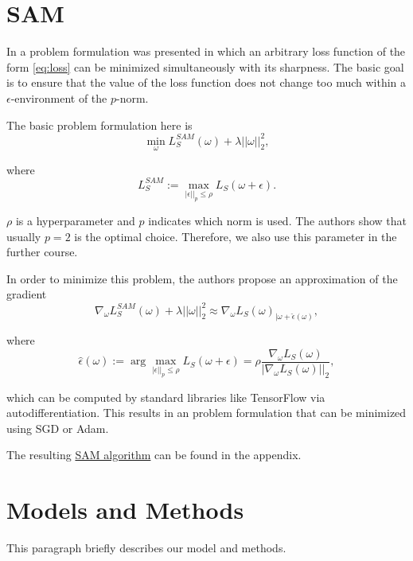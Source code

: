 \documentclass[10pt,conference,compsocconf]{IEEEtran}
\begin{document}
\section{SAM}
In \cite{foret2021sharpnessaware} a problem formulation was presented in which an arbitrary loss function of the form \eqref{eq:loss} can be minimized simultaneously with its sharpness. The basic goal is to ensure that the value of the loss function does not change too much within a $\epsilon$-environment of the $p$-norm. 

The basic problem formulation here is 
\begin{equation} \label{eq:sam_real}
\min_\omega L_S^{SAM}(\omega) + \lambda ||\omega||_2^2,
\end{equation}

where 
\begin{equation} \label{eq:sam_eps}
L_S^{SAM} := \max_{|\epsilon||_p \leq \rho} L_S(\omega + \epsilon).
\end{equation}

$\rho$ is a hyperparameter and $p$ indicates which norm is used. The authors show that usually $p = 2$ is the optimal choice. Therefore, we also use this parameter in the further course. 

In order to minimize this problem, the authors propose an approximation of the gradient 
\begin{equation} \label{eq:sam_approx}
\nabla_\omega L_S^{SAM}(\omega) + \lambda ||\omega||_2^2 \approx \nabla_\omega L_S(\omega)_{|\omega + \hat{\epsilon}(\omega)}, 
\end{equation}

where 
\begin{equation} \label{eq:sam_eps_hat}
\hat{\epsilon}(\omega) := \arg \max_{|\epsilon||_p \leq \rho} L_S(\omega + \epsilon) = \rho \frac{\nabla_\omega L_S(\omega)}{|\nabla_\omega L_S(\omega)||_2},
\end{equation}

 which can be computed by standard libraries like TensorFlow via autodifferentiation. This results in an problem formulation that can be minimized using SGD or Adam. 

The resulting \hyperref[alg:sam]{SAM algorithm} can be found in the appendix. 

\section{Models and Methods}
This paragraph briefly describes our model and methods. 
\end{document}
